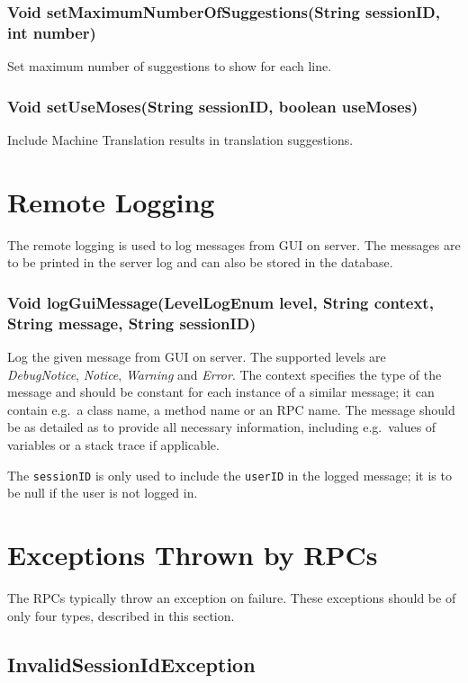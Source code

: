 {\subsubsection{Void setMaximumNumberOfSuggestions(String sessionID, int number)}
Set maximum number of suggestions to show for each line.

\subsubsection{Void setUseMoses(String sessionID, boolean useMoses)}
Include Machine Translation results in translation suggestions.

\section{Remote Logging}
\label{sec:rpc:remotelog}

The remote logging is used to log messages from GUI on server. The messages are to be printed in the server log and can also be stored in the database.

\subsubsection{Void logGuiMessage(LevelLogEnum level, String context, String message, String sessionID)}
Log the given message from GUI on server.
The supported levels are \emph{DebugNotice}, \emph{Notice}, \emph{Warning} and \emph{Error}.
The context specifies the type of the message and should be constant for each instance of a similar message; it can contain e.g.\ a class name, a method name or an RPC name. The message should be as detailed as to provide all necessary information, including e.g.\ values of variables or a stack trace if applicable.

The {\tt sessionID} is only used to include the {\tt userID} in the logged message; it is to be null if the user is not logged in.

\section{Exceptions Thrown by RPCs}
\label{sec:rpc:exceptions}

The RPCs typically throw an exception on failure. These exceptions should be of only four types, described in this section.

\subsection{InvalidSessionIdException}

}
